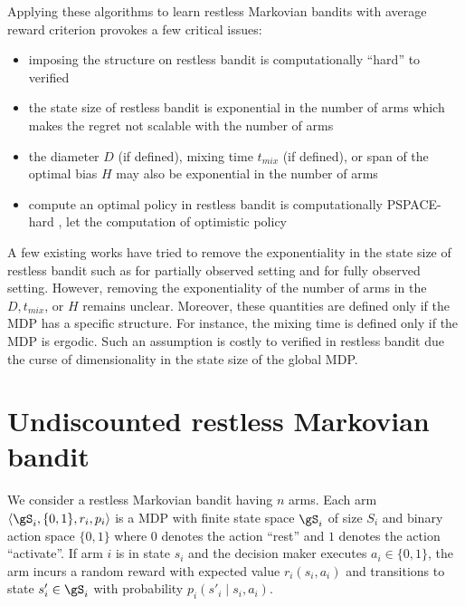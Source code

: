 Applying these algorithms to learn restless Markovian bandits with average reward criterion provokes a few critical issues:
\begin{itemize}
    \item imposing the structure on restless bandit is computationally ``hard'' to verified
    \item the state size of restless bandit is exponential in the number of arms which makes the regret not scalable with the number of arms
    \item the diameter $D$ (if defined), mixing time $t_{mix}$ (if defined), or span of the optimal bias $H$ may also be exponential in the number of arms
    \item compute an optimal policy in restless bandit is computationally PSPACE-hard \cite{papadimitriou1994complexity}, let the computation of optimistic policy
\end{itemize}

A few existing works have tried to remove the exponentiality in the state size of restless bandit such as \cite{jung2019regret, ortner2012regret, wang2020restless} for partially observed setting and \cite{akbarzadeh2022learning} for fully observed setting.
However, removing the exponentiality of the number of arms in the $D, t_{mix}$, or $H$ remains unclear.
Moreover, these quantities are defined only if the MDP has a specific structure.
For instance, the mixing time is defined only if the MDP is ergodic.
Such an assumption is costly to verified in restless bandit due the curse of dimensionality in the state size of the global MDP.

\section{Undiscounted restless Markovian bandit}
\label{ch:restless:sec:restless}

We consider a restless Markovian bandit having $n$ arms.
Each arm $\langle\gS_i, \{0,1\}, r_i, p_i\rangle$ is a MDP with finite state space $\gS_i$ of size $S_i$ and binary action space $\{0,1\}$ where $0$ denotes the action ``rest'' and $1$ denotes the action ``activate''.
If arm $i$ is in state $s_i$ and the decision maker executes $a_i\in\{0,1\}$, the arm incurs a random reward with expected value $r_i(s_i,a_i)$ and transitions to state $s'_i\in\gS_i$ with probability $p_i(s'_i\mid s_i,a_i)$.

